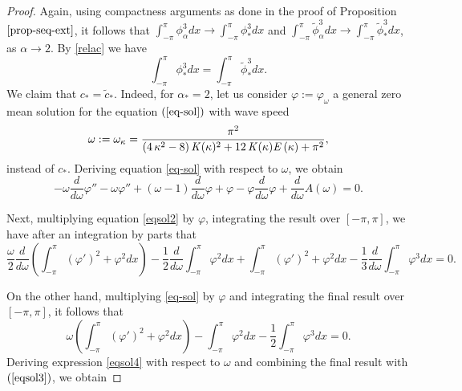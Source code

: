 \documentclass[12pt,reqno]{amsart}
\newcommand{\2}{L^2_{per}(0, T)}
\numberwithin{equation}{section}
\numberwithin{figure}{section}
\begin{document}
\begin{proof}
			Again, using compactness arguments as done in the proof of  Proposition $\ref{prop-seq-ext}$, it follows that $
			\int_{-\pi}^{\pi}\phi_{\alpha}^3dx \rightarrow \int_{-\pi}^{\pi}\phi_{*}^3dx $ and $\int_{-\pi}^{\pi}\tilde{\phi}_{\alpha}^3dx \rightarrow \int_{-\pi}^{\pi}\tilde{\phi}_{*}^3dx$, as $\alpha\rightarrow 2$. By \eqref{relac} we have
			\begin{equation}\label{igualdadecub}
				\int_{-\pi}^{\pi}\phi_{*}^3dx = \int_{-\pi}^{\pi}\tilde{\phi}_{*}^3dx.
			\end{equation}
			\indent We claim that $c_{*}= \tilde{c}_{*}$. Indeed, for $\alpha_{*} =2$, let us consider $\varphi:=\varphi_{\omega}$ a general zero mean solution for the equation
			$(\ref{eq-sol})$ with wave speed $$\omega:=\omega_{\kappa}={\frac {{\pi }^{2}}{ \left( 4\,{\kappa}^{2}-8 \right)   {\it
						K}(\kappa)^{2}+12\,{\it K} ( \kappa)
					{\it E} \left( \kappa \right) +{\pi }^{2}}},$$ instead of $c_{*}$. Deriving equation \eqref{eq-sol} with respect to $\omega$, we obtain
			\begin{equation}\label{eqsol2}
				\displaystyle
				- \omega\frac{d}{d\omega}\varphi'' -\omega\varphi''+ (\omega-1)\frac{d}{d\omega}\varphi +\varphi-\varphi\frac{d}{d\omega}\varphi+\frac{d}{d\omega}A(\omega)=0.
			\end{equation}
			
			Next, multiplying equation \eqref{eqsol2} by $\varphi$, integrating the result over $[-\pi,\pi]$, we have after an integration by parts that
			\begin{equation}\label{eqsol3}
				\displaystyle
				\frac{\omega}{2}\frac{d}{d\omega}\left(\int_{-\pi}^{\pi}(\varphi')^2  + \varphi^2dx \right) -\frac{1}{2}\frac{d}{d\omega}\int_{-\pi}^{\pi}\varphi^2dx + \int_{-\pi}^{\pi}(\varphi')^2 + \varphi^2dx -\frac{1}{3}\frac{d}{d\omega}\int_{-\pi}^{\pi}\varphi^3dx =0.
			\end{equation}
			
			On the other hand, multiplying \eqref{eq-sol} by $\varphi$ and integrating the final result over  $[-\pi,\pi]$, it follows that
			\begin{equation}\label{eqsol4}
				\displaystyle
				\omega\left(\int_{-\pi}^{\pi}(\varphi')^2  + \varphi^2dx \right) - \int_{-\pi}^{\pi}\varphi^2 dx -  \frac{1}{2}\int_{-\pi}^{\pi}\varphi^3 dx =0.
			\end{equation}
			Deriving expression \eqref{eqsol4} with respect to $\omega$ and combining the final result with $(\ref{eqsol3})$, we obtain
			

\end{proof}
\end{document}

